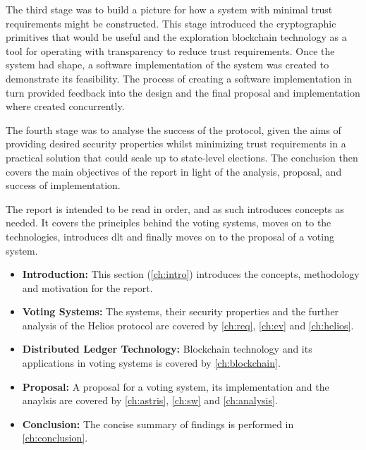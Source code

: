 The third stage was to build a picture for how a system with minimal trust requirements might be constructed. This stage introduced the cryptographic primitives that would be useful and the exploration blockchain technology as a tool for operating with transparency to reduce trust requirements. Once the system had shape, a software implementation of the system was created to demonstrate its feasibility. The process of creating a software implementation in turn provided feedback into the design and the final proposal and implementation where created concurrently.

The fourth stage was to analyse the success of the protocol, given the aims of providing desired security properties whilst minimizing trust requirements in a practical solution that could scale up to state-level elections. The conclusion then covers the main objectives of the report in light of the analysis, proposal, and success of implementation.

The report is intended to be read in order, and as such introduces concepts as needed. It covers the principles behind the voting systems, moves on to the technologies, introduces \gls{dlt} and finally moves on to the proposal of a voting system.

\begin{itemize}
    \item \textbf{Introduction:} This section (\autoref{ch:intro}) introduces the concepts, methodology and motivation for the report.
    \item \textbf{Voting Systems:} The systems, their security properties and the further analysis of the Helios protocol are covered by \autoref{ch:req}, \autoref{ch:ev} and \autoref{ch:helios}.
    \item \textbf{Distributed Ledger Technology:} Blockchain technology and its applications in voting systems is covered by \autoref{ch:blockchain}.
    \item \textbf{Proposal:} A proposal for a voting system, its implementation and the anaylsis are covered by \autoref{ch:astris}, \autoref{ch:sw} and \autoref{ch:analysis}.
    \item \textbf{Conclusion:} The concise summary of findings is performed in \autoref{ch:conclusion}.
\end{itemize}




